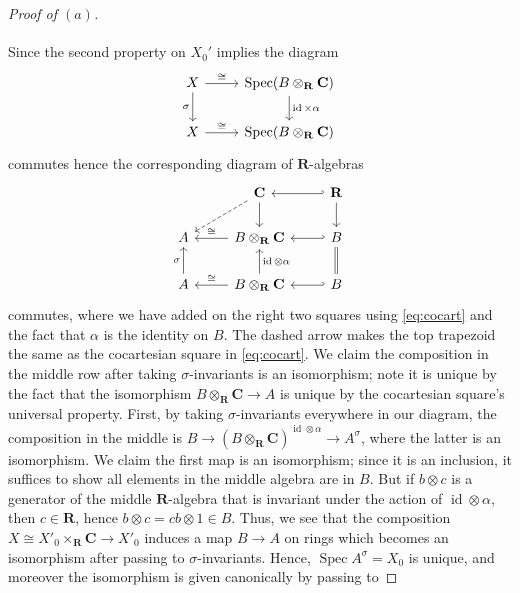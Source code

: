 \documentclass[10pt]{article}
\theoremstyle{definition}
\theoremstyle{remark}
\numberwithin{equation}{section}
\numberwithin{figure}{subsubsection}
\DeclareMathOperator{\Spec}{Spec}
\DeclareMathOperator{\id}{id}
\begin{document}
\begin{proof}[Proof of $(a)$]
\begin{equation}
\begin{tikzcd}
    \end{tikzcd}
  \end{equation}
  Since the second property on $X_0'$ implies the diagram
  \begin{equation*}
    \begin{tikzcd}
      X \dar[swap]{\sigma}\rar{\cong} &
      \Spec (B \otimes_\mathbf{R} \mathbf{C}) \dar{\id \times \alpha}\\
      X \rar{\cong} & \Spec (B \otimes_\mathbf{R} \mathbf{C})
    \end{tikzcd}
  \end{equation*}
  commutes hence the corresponding diagram of $\mathbf{R}$-algebras
  \begin{equation}\label{eq:sameact}
    \begin{tikzcd}
      & \mathbf{C}\dar\arrow[dashed]{dl} & \lar[hook']\mathbf{R}\dar\\
      A & B \otimes_\mathbf{R} \mathbf{C} \lar[swap]{\cong} & B\lar[hook']\\
      A \uar{\sigma} & B \otimes_\mathbf{R} \mathbf{C} \uar[swap]{\id \otimes \alpha}
      \lar[swap]{\cong} & B\uar[equal]\lar[hook']
    \end{tikzcd}
  \end{equation}
  commutes, where we have added on the right two squares using \eqref{eq:cocart}
  and the fact that $\alpha$ is the identity on $B$. The dashed arrow makes the
  top trapezoid the same as the cocartesian square in \eqref{eq:cocart}. We
  claim the composition in the middle row after taking $\sigma$-invariants
  is an isomorphism; note it is unique by the fact that the isomorphism $B
  \otimes_\mathbf{R} \mathbf{C} \to A$ is unique by the cocartesian square's
  universal property. First, by taking
  $\sigma$-invariants everywhere in our diagram, the composition in the middle
  is $B \to (B \otimes_\mathbf{R} \mathbf{C})^{\id \otimes \alpha} \to
  A^\sigma$, where the latter is an isomorphism. We claim the first map is an
  isomorphism; since it is an inclusion, it suffices to show all elements in the
  middle algebra are in $B$. But if $b \otimes c$ is a generator of the middle
  $\mathbf{R}$-algebra that is invariant under the action of $\id \otimes
  \alpha$, then $c \in \mathbf{R}$, hence $b\otimes c = cb \otimes 1 \in B$.
  Thus, we see that the composition $X \cong X'_0 \times_\mathbf{R} \mathbf{C}
  \to X'_0$ induces a map $B \to A$ on rings which becomes an isomorphism after
  passing to $\sigma$-invariants. Hence, $\Spec A^\sigma = X_0$ is unique, and
  moreover the isomorphism is given canonically by passing to

\end{proof}
\end{document}
